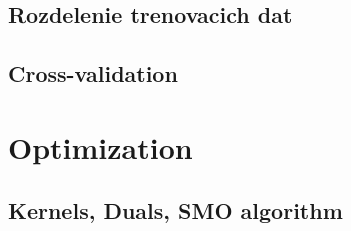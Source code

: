 \documentclass[10pt,a4paper]{article}
\begin{document}
\subsection{Rozdelenie trenovacich dat}

\subsection{Cross-validation}



\section{Optimization}

\subsection{Kernels, Duals, SMO algorithm}



\end{document}
